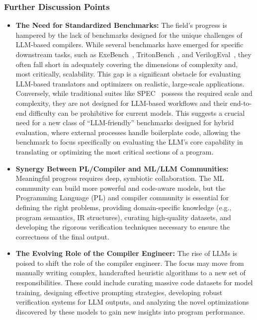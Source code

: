 \documentclass[pdflatex,sn-mathphys-ay,twocolumn, a4paper]{sn-jnl}%
\theoremstyle{thmstyleone}%
\theoremstyle{thmstyletwo}%
\theoremstyle{thmstylethree}%
\begin{document}
\subsubsection{Further Discussion Points}
\begin{itemize}
    \item \textbf{The Need for Standardized Benchmarks:} The field's progress is hampered by the lack of benchmarks designed for the unique challenges of LLM-based compilers. While several benchmarks have emerged for specific downstream tasks, such as ExeBench~\citep{exebench_2022_maps}, TritonBench~\citep{tritonbench_2025_acl}, and VerilogEval~\citep{verilogeval_2023_iccad}, they often fall short in adequately covering the dimensions of complexity and, most critically, scalability. This gap is a significant obstacle for evaluating LLM-based translators and optimizers on realistic, large-scale applications. Conversely, while traditional suites like SPEC~\citep{spec_2006} possess the required scale and complexity, they are not designed for LLM-based workflows and their end-to-end difficulty can be prohibitive for current models. This suggests a crucial need for a new class of ``LLM-friendly'' benchmarks designed for hybrid evaluation, where external processes handle boilerplate code, allowing the benchmark to focus specifically on evaluating the LLM's core capability in translating or optimizing the most critical sections of a program.
    \item \textbf{Synergy Between PL/Compiler and ML/LLM Communities:} Meaningful progress requires deep, symbiotic collaboration. The ML community can build more powerful and code-aware models, but the Programming Language (PL) and compiler community is essential for defining the right problems, providing domain-specific knowledge (e.g., program semantics, IR structures), curating high-quality datasets, and developing the rigorous verification techniques necessary to ensure the correctness of the final output.
    \item \textbf{The Evolving Role of the Compiler Engineer:} The rise of LLMs is poised to shift the role of the compiler engineer. The focus may move from manually writing complex, handcrafted heuristic algorithms to a new set of responsibilities. These could include curating massive code datasets for model training, designing effective prompting strategies, developing robust verification systems for LLM outputs, and analyzing the novel optimizations discovered by these models to gain new insights into program performance.
\end{itemize}
\end{document}
